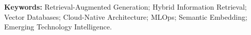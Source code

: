 \medskip
\noindent\textbf{Keywords:} Retrieval-Augmented Generation; Hybrid Information Retrieval; Vector Databases; Cloud-Native Architecture; MLOps; Semantic Embedding; Emerging Technology Intelligence.

\newpage\tableofcontents

\newpage
{}


